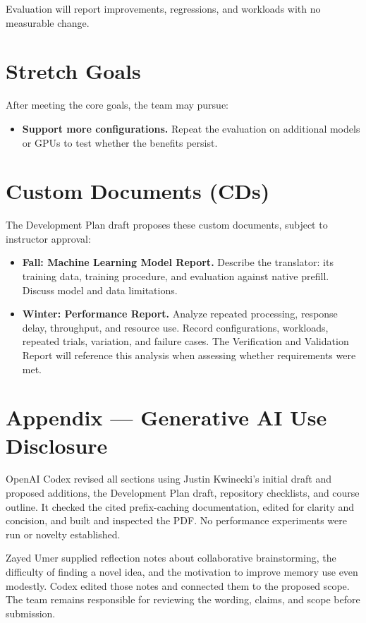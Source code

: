 \documentclass[11pt]{article}
\begin{document}
Evaluation will report improvements, regressions, and workloads with no
measurable change.

\section{Stretch Goals}

After meeting the core goals, the team may pursue:
\begin{itemize}
  \item \textbf{Support more configurations.} Repeat the evaluation on
  additional models or GPUs to test whether the benefits persist.
\end{itemize}

\section{Custom Documents (CDs)}

The Development Plan draft proposes these custom documents, subject to
instructor approval:

\begin{itemize}
  \item \textbf{Fall: Machine Learning Model Report.} Describe the translator:
  its training data, training procedure, and evaluation against native
  prefill. Discuss model and data limitations.
  \item \textbf{Winter: Performance Report.} Analyze repeated processing,
  response delay, throughput, and resource use. Record configurations,
  workloads, repeated trials, variation, and failure cases. The Verification
  and Validation Report will reference this analysis when assessing
  whether requirements were met.
\end{itemize}




\section*{Appendix --- Generative AI Use Disclosure}

OpenAI Codex revised all sections using Justin Kwinecki's initial draft
and proposed additions, the Development Plan draft, repository checklists,
and course outline. It checked the cited prefix-caching documentation,
edited for clarity and concision, and built and inspected the PDF. No
performance experiments were run or novelty established.

Zayed Umer supplied reflection notes about collaborative brainstorming,
the difficulty of finding a novel idea, and the motivation to improve
memory use even modestly. Codex edited those notes and connected them to
the proposed scope. The team remains responsible for reviewing the wording,
claims, and scope before submission.
\end{document}
